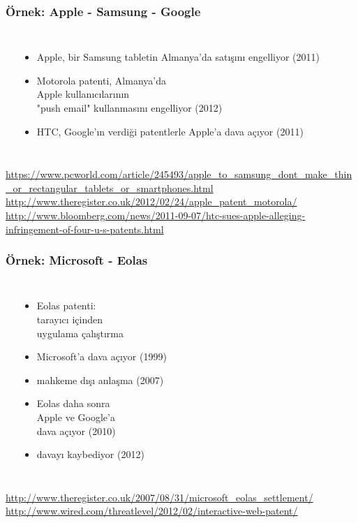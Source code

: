 \documentclass[dvipsnames]{beamer}
\theoremstyle{definition}
\theoremstyle{example}
\theoremstyle{plain}
\begin{document}
\begin{frame}
  \frametitle{Örnek: Apple - Samsung - Google}

  \begin{columns}
    \begin{center}
    \end{center}

    \begin{itemize}
      \item Apple, bir Samsung tabletin Almanya'da satışını engelliyor (2011)
      \item Motorola patenti, Almanya'da\\
        Apple kullanıcılarının\\
        "push email" kullanmasını engelliyor (2012)
      \item HTC, Google'ın verdiği patentlerle Apple'a dava açıyor (2011)
    \end{itemize}
  \end{columns}

  \medskip
  \tiny{\url{https://www.pcworld.com/article/245493/apple_to_samsung_dont_make_thin_or_rectangular_tablets_or_smartphones.html}}\\
  \tiny{\url{http://www.theregister.co.uk/2012/02/24/apple_patent_motorola/}}\\
  \tiny{\url{http://www.bloomberg.com/news/2011-09-07/htc-sues-apple-alleging-infringement-of-four-u-s-patents.html}}\\
\end{frame}

\begin{frame}
  \frametitle{Örnek: Microsoft - Eolas}

  \begin{columns}
    \begin{center}
    \end{center}

    \begin{itemize}
      \item Eolas patenti:\\
        tarayıcı içinden\\
        uygulama çalıştırma
      \item Microsoft'a dava açıyor (1999)
      \item mahkeme dışı anlaşma (2007)

      \pause
      \item Eolas daha sonra\\
        Apple ve Google'a\\
        dava açıyor (2010)
      \item davayı kaybediyor (2012)
    \end{itemize}
  \end{columns}

  \medskip
  \tiny{\url{http://www.theregister.co.uk/2007/08/31/microsoft_eolas_settlement/}}\\
  \tiny{\url{http://www.wired.com/threatlevel/2012/02/interactive-web-patent/}}\\
\end{frame}
\end{document}
